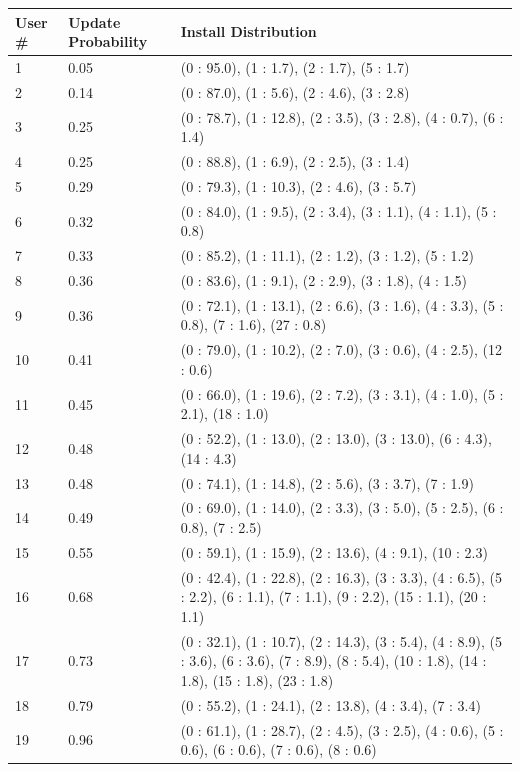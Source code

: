 \begin{table}
\begin{tabular}{|l|l ||  p{8.5cm}|}
\hline User \# & Update Probability & Install Distribution  \\ \hline \hline
1  &  0.05	 & 	(0 : 95.0), (1 : 1.7), (2 : 1.7), (5 : 1.7)\\ \hline 
2  &  0.14	 & 	(0 : 87.0), (1 : 5.6), (2 : 4.6), (3 : 2.8)\\ \hline 
3  &  0.25	 & 	(0 : 78.7), (1 : 12.8), (2 : 3.5), (3 : 2.8), (4 : 0.7), (6 : 1.4)\\ \hline 
4  &  0.25	 & 	(0 : 88.8), (1 : 6.9), (2 : 2.5), (3 : 1.4)\\ \hline 
5  &  0.29	 & 	(0 : 79.3), (1 : 10.3), (2 : 4.6), (3 : 5.7)\\ \hline 
6  &  0.32	 & 	(0 : 84.0), (1 : 9.5), (2 : 3.4), (3 : 1.1), (4 : 1.1), (5 : 0.8)\\ \hline 
7  &  0.33	 & 	(0 : 85.2), (1 : 11.1), (2 : 1.2), (3 : 1.2), (5 : 1.2)\\ \hline 
8  &  0.36	 & 	(0 : 83.6), (1 : 9.1), (2 : 2.9), (3 : 1.8), (4 : 1.5)\\ \hline 
9  &  0.36	 & 	(0 : 72.1), (1 : 13.1), (2 : 6.6), (3 : 1.6), (4 : 3.3), (5 : 0.8), (7 : 1.6), (27 : 0.8)\\ \hline 
10  &  0.41	 & 	(0 : 79.0), (1 : 10.2), (2 : 7.0), (3 : 0.6), (4 : 2.5), (12 : 0.6)\\ \hline 
11  &  0.45	 & 	(0 : 66.0), (1 : 19.6), (2 : 7.2), (3 : 3.1), (4 : 1.0), (5 : 2.1), (18 : 1.0)\\ \hline 
12  &  0.48	 & 	(0 : 52.2), (1 : 13.0), (2 : 13.0), (3 : 13.0), (6 : 4.3), (14 : 4.3)\\ \hline 
13  &  0.48	 & 	(0 : 74.1), (1 : 14.8), (2 : 5.6), (3 : 3.7), (7 : 1.9)\\ \hline 
14  &  0.49	 & 	(0 : 69.0), (1 : 14.0), (2 : 3.3), (3 : 5.0), (5 : 2.5), (6 : 0.8), (7 : 2.5)\\ \hline 
15  &  0.55	 & 	(0 : 59.1), (1 : 15.9), (2 : 13.6), (4 : 9.1), (10 : 2.3)\\ \hline 
16  &  0.68	 & 	(0 : 42.4), (1 : 22.8), (2 : 16.3), (3 : 3.3), (4 : 6.5), (5 : 2.2), (6 : 1.1), (7 : 1.1), (9 : 2.2), (15 : 1.1), (20 : 1.1)\\ \hline 
17  &  0.73	 & 	(0 : 32.1), (1 : 10.7), (2 : 14.3), (3 : 5.4), (4 : 8.9), (5 : 3.6), (6 : 3.6), (7 : 8.9), (8 : 5.4), (10 : 1.8), (14 : 1.8), (15 : 1.8), (23 : 1.8)\\ \hline 
18  &  0.79	 & 	(0 : 55.2), (1 : 24.1), (2 : 13.8), (4 : 3.4), (7 : 3.4)\\ \hline 
19  &  0.96	 & 	(0 : 61.1), (1 : 28.7), (2 : 4.5), (3 : 2.5), (4 : 0.6), (5 : 0.6), (6 : 0.6), (7 : 0.6), (8 : 0.6)\\ \hline 


\end{tabular}
\end{table}
